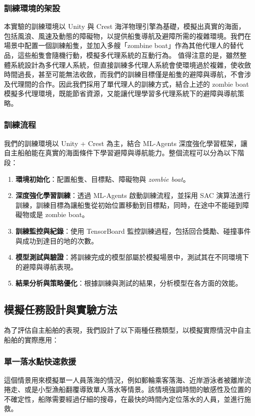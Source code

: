 \documentclass[12pt,a4paper]{ctexart}
\begin{document}
\subsubsection{訓練環境的架設}
本實驗的訓練環境以 Unity 與 Crest 海洋物理引擎為基礎，模擬出真實的海面，包括風浪、風速及動態的障礙物，以提供船隻導航及避障所需的複雜環境。我們在場景中配置一個訓練船隻，並加入多艘「zombine boat」作為其他代理人的替代品，這些船隻會隨機行動，模擬多代理系統的互動行為。
值得注意的是，雖然整體系統設計為多代理人系統，但直接訓練多代理人系統會使環境過於複雜，使收斂時間過長，甚至可能無法收斂，而我們的訓練目標僅是船隻的避障與導航，不會涉及代理間的合作。因此我們採用了單代理人的訓練方式，結合上述的 zombie boat 模擬多代理環境，既能節省資源，又能讓代理學習多代理系統下的避障與導航策略。

\subsubsection{訓練流程}
我們的訓練環境以 Unity + Crest 為主，結合 ML-Agents 深度強化學習框架，讓自主船舶能在真實的海面條件下學習避障與導航能力。整個流程可以分為以下階段：
\begin{enumerate}
    \item \textbf{環境初始化}：配置船隻、目標點、障礙物與 \textit{zombie boat}。
    \item \textbf{深度強化學習訓練}：透過 ML-Agents 啟動訓練流程，並採用 SAC 演算法進行訓練，訓練目標為讓船隻從初始位置移動到目標點，同時，在途中不能碰到障礙物或是 zombie boat。
    \item \textbf{訓練監控與紀錄}：使用 TensorBoard 監控訓練過程，包括回合獎勵、碰撞事件與成功到達目的地的次數。
    \item \textbf{模型測試與驗證}：將訓練完成的模型部屬於模擬場景中，測試其在不同環境下的避障與導航表現。
    \item \textbf{結果分析與策略優化}：根據訓練與測試的結果，分析模型在各方面的效能。
\end{enumerate}

\subsection{模擬任務設計與實驗方法}
為了評估自主船舶的表現，我們設計了以下兩種任務類型，以模擬實際情況中自主船舶的實際應用：

\subsubsection{單一落水點快速救援}
這個情景用來模擬單一人員落海的情況，例如郵輪乘客落海、近岸游泳者被離岸流捲走、或是小型漁船翻覆導致單人落水等情景。該情境強調時間的敏感性及位置的不確定性，船隊需要經過仔細的搜尋，在最快的時間內定位落水的人員，並進行施救。
\end{document}
